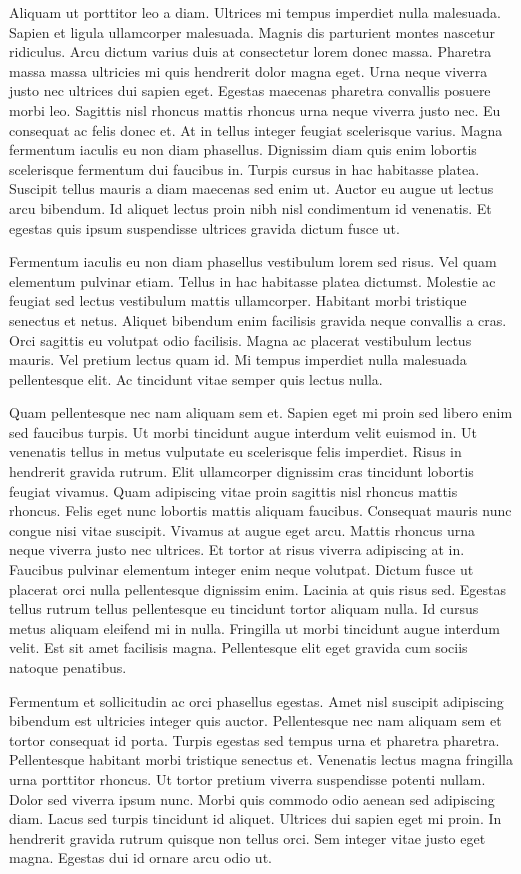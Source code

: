 Aliquam ut porttitor leo a diam. Ultrices mi tempus imperdiet nulla malesuada. Sapien et ligula ullamcorper malesuada. Magnis dis parturient montes nascetur ridiculus. Arcu dictum varius duis at consectetur lorem donec massa. Pharetra massa massa ultricies mi quis hendrerit dolor magna eget. Urna neque viverra justo nec ultrices dui sapien eget. Egestas maecenas pharetra convallis posuere morbi leo. Sagittis nisl rhoncus mattis rhoncus urna neque viverra justo nec. Eu consequat ac felis donec et. At in tellus integer feugiat scelerisque varius. Magna fermentum iaculis eu non diam phasellus. Dignissim diam quis enim lobortis scelerisque fermentum dui faucibus in. Turpis cursus in hac habitasse platea. Suscipit tellus mauris a diam maecenas sed enim ut. Auctor eu augue ut lectus arcu bibendum. Id aliquet lectus proin nibh nisl condimentum id venenatis. Et egestas quis ipsum suspendisse ultrices gravida dictum fusce ut.

Fermentum iaculis eu non diam phasellus vestibulum lorem sed risus. Vel quam elementum pulvinar etiam. Tellus in hac habitasse platea dictumst. Molestie ac feugiat sed lectus vestibulum mattis ullamcorper. Habitant morbi tristique senectus et netus. Aliquet bibendum enim facilisis gravida neque convallis a cras. Orci sagittis eu volutpat odio facilisis. Magna ac placerat vestibulum lectus mauris. Vel pretium lectus quam id. Mi tempus imperdiet nulla malesuada pellentesque elit. Ac tincidunt vitae semper quis lectus nulla.

Quam pellentesque nec nam aliquam sem et. Sapien eget mi proin sed libero enim sed faucibus turpis. Ut morbi tincidunt augue interdum velit euismod in. Ut venenatis tellus in metus vulputate eu scelerisque felis imperdiet. Risus in hendrerit gravida rutrum. Elit ullamcorper dignissim cras tincidunt lobortis feugiat vivamus. Quam adipiscing vitae proin sagittis nisl rhoncus mattis rhoncus. Felis eget nunc lobortis mattis aliquam faucibus. Consequat mauris nunc congue nisi vitae suscipit. Vivamus at augue eget arcu. Mattis rhoncus urna neque viverra justo nec ultrices. Et tortor at risus viverra adipiscing at in. Faucibus pulvinar elementum integer enim neque volutpat. Dictum fusce ut placerat orci nulla pellentesque dignissim enim. Lacinia at quis risus sed. Egestas tellus rutrum tellus pellentesque eu tincidunt tortor aliquam nulla. Id cursus metus aliquam eleifend mi in nulla. Fringilla ut morbi tincidunt augue interdum velit. Est sit amet facilisis magna. Pellentesque elit eget gravida cum sociis natoque penatibus.

Fermentum et sollicitudin ac orci phasellus egestas. Amet nisl suscipit adipiscing bibendum est ultricies integer quis auctor. Pellentesque nec nam aliquam sem et tortor consequat id porta. Turpis egestas sed tempus urna et pharetra pharetra. Pellentesque habitant morbi tristique senectus et. Venenatis lectus magna fringilla urna porttitor rhoncus. Ut tortor pretium viverra suspendisse potenti nullam. Dolor sed viverra ipsum nunc. Morbi quis commodo odio aenean sed adipiscing diam. Lacus sed turpis tincidunt id aliquet. Ultrices dui sapien eget mi proin. In hendrerit gravida rutrum quisque non tellus orci. Sem integer vitae justo eget magna. Egestas dui id ornare arcu odio ut.


